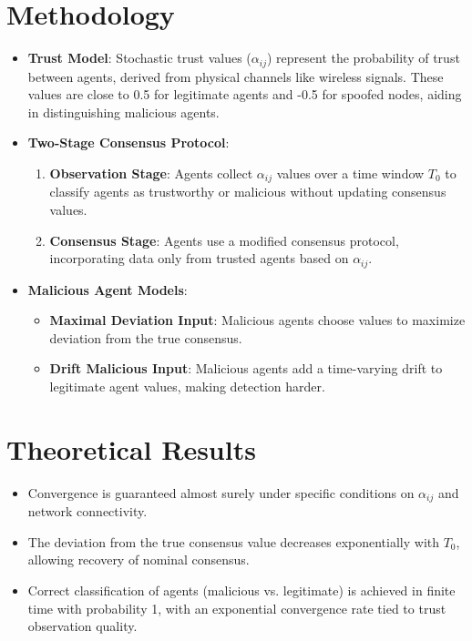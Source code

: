 \documentclass{article}
\begin{document}
\section*{Methodology}
\begin{itemize}
    \item \textbf{Trust Model}: Stochastic trust values ($\alpha_{ij}$) represent the probability of trust between agents, derived from physical channels like wireless signals. These values are close to 0.5 for legitimate agents and -0.5 for spoofed nodes, aiding in distinguishing malicious agents.
    \item \textbf{Two-Stage Consensus Protocol}:
    \begin{enumerate}
        \item \textbf{Observation Stage}: Agents collect $\alpha_{ij}$ values over a time window $T_0$ to classify agents as trustworthy or malicious without updating consensus values.
        \item \textbf{Consensus Stage}: Agents use a modified consensus protocol, incorporating data only from trusted agents based on $\alpha_{ij}$.
    \end{enumerate}
    \item \textbf{Malicious Agent Models}:
    \begin{itemize}
        \item \textbf{Maximal Deviation Input}: Malicious agents choose values to maximize deviation from the true consensus.
        \item \textbf{Drift Malicious Input}: Malicious agents add a time-varying drift to legitimate agent values, making detection harder.
    \end{itemize}
\end{itemize}

\section*{Theoretical Results}
\begin{itemize}
    \item Convergence is guaranteed almost surely under specific conditions on $\alpha_{ij}$ and network connectivity.
    \item The deviation from the true consensus value decreases exponentially with $T_0$, allowing recovery of nominal consensus.
    \item Correct classification of agents (malicious vs. legitimate) is achieved in finite time with probability 1, with an exponential convergence rate tied to trust observation quality.
\end{itemize}
\end{document}
